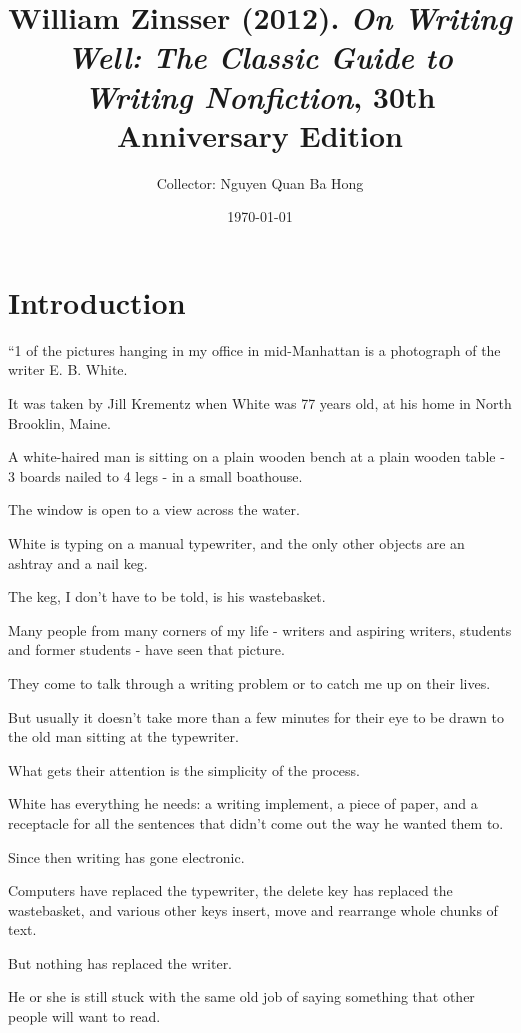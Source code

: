 \documentclass{book}
\title{William Zinsser (2012). \textit{On Writing Well: The Classic Guide to Writing Nonfiction}, 30th Anniversary Edition}
\author{Collector: Nguyen Quan Ba Hong}
\date{\today}
\numberwithin{equation}{section}
\begin{document}
\maketitle
\setcounter{secnumdepth}{6}
\setcounter{tocdepth}{6}
\tableofcontents


\chapter*{Introduction}

``1 of the pictures hanging in my office in mid-Manhattan is a photograph of the writer E. B. White.

It was taken by Jill Krementz when White was 77 years old, at his home in North Brooklin, Maine.

A white-haired man is sitting on a plain wooden bench at a plain wooden table - 3 boards nailed to 4 legs - in a small boathouse.

The window is open to a view across the water.

White is typing on a manual typewriter, and the only other objects are an ashtray and a nail keg.

The keg, I don't have to be told, is his wastebasket.

%
Many people from many corners of my life - writers and aspiring writers, students and former students - have seen that picture.

They come to talk through a writing problem or to catch me up on their lives.

But usually it doesn't take more than a few minutes for their eye to be drawn to the old man sitting at the typewriter.

What gets their attention is the simplicity of the process.

White has everything he needs: a writing implement, a piece of paper, and a receptacle for all the sentences that didn't come out the way he wanted them to.

%
Since then writing has gone electronic.

Computers have replaced the typewriter, the delete key has replaced the wastebasket, and various other keys insert, move and rearrange whole chunks of text.

But nothing has replaced the writer.

He or she is still stuck with the same old job of saying something that other people will want to read.
\end{document}
